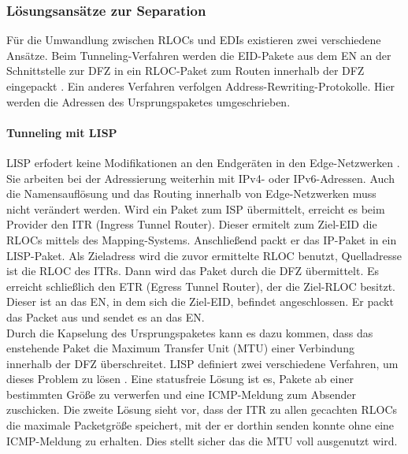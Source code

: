 \subsubsection{Lösungsansätze zur Separation}
Für die Umwandlung zwischen RLOCs und EDIs existieren zwei verschiedene Ansätze. Beim Tunneling-Verfahren werden die EID-Pakete aus dem EN an der Schnittstelle zur DFZ in ein RLOC-Paket zum Routen innerhalb der DFZ eingepackt \cite{farinacci:2009:LISP}. Ein anderes Verfahren verfolgen Address-Rewriting-Protokolle. Hier werden die Adressen des Ursprungspaketes umgeschrieben. 

\paragraph{Tunneling mit LISP}
LISP erfodert keine Modifikationen an den Endgeräten in den Edge-Netzwerken \cite{farinacci:2009:LISP}. Sie arbeiten bei der Adressierung weiterhin mit IPv4- oder IPv6-Adressen. Auch die Namensauflösung und das Routing innerhalb von Edge-Netzwerken muss nicht verändert werden. Wird ein Paket zum ISP übermittelt, erreicht es beim Provider den ITR (Ingress Tunnel Router). Dieser ermitelt zum Ziel-EID die RLOCs mittels des Mapping-Systems. Anschließend packt er das IP-Paket in ein LISP-Paket. Als Zieladress wird die zuvor ermittelte RLOC benutzt, Quelladresse ist die RLOC des ITRs. Dann wird das Paket durch die DFZ übermittelt. Es erreicht schließlich den ETR (Egress Tunnel Router), der die Ziel-RLOC besitzt. Dieser ist an das EN, in dem sich die Ziel-EID, befindet angeschlossen. Er packt das Packet aus und sendet es an das EN. \\
Durch die Kapselung des Ursprungspaketes kann es dazu kommen, dass das enstehende Paket die Maximum Transfer Unit (MTU) einer Verbindung innerhalb der DFZ überschreitet. LISP definiert zwei verschiedene Verfahren, um dieses Problem zu lösen \cite{farinacci:2009:LISP}. Eine statusfreie Lösung ist es, Pakete ab einer bestimmten Größe zu verwerfen und eine ICMP-Meldung zum Absender zuschicken. Die zweite Lösung sieht vor, dass der ITR zu allen gecachten RLOCs die maximale Packetgröße speichert, mit der er dorthin senden konnte ohne eine ICMP-Meldung zu erhalten. Dies stellt sicher das die MTU voll ausgenutzt wird.

